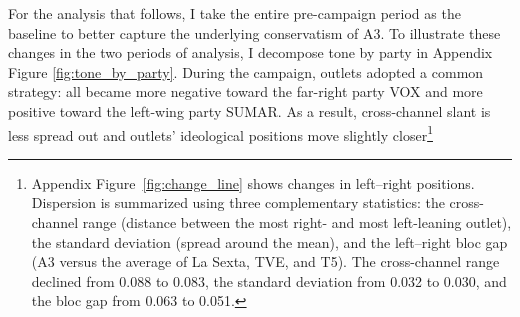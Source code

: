 \documentclass[12pt]{article}
\begin{document}
	For the analysis that follows, I take the entire pre-campaign period as the baseline to better capture the underlying conservatism of A3. To illustrate these changes in the two periods of analysis, I decompose tone by party in Appendix Figure \ref{fig:tone_by_party}. During the campaign, outlets adopted a common strategy: all became more negative toward the far-right party VOX and more positive toward the left-wing party SUMAR. As a result, cross-channel slant is less spread out and outlets’ ideological positions move slightly closer\footnote{Appendix Figure~\ref{fig:change_line} shows changes in left–right positions. Dispersion is summarized using three complementary statistics: the cross-channel range (distance between the most right- and most left-leaning outlet), the standard deviation (spread around the mean), and the left–right bloc gap (A3 versus the average of La Sexta, TVE, and T5). The cross-channel range declined from 0.088 to 0.083, the standard deviation from 0.032 to 0.030, and the bloc gap from 0.063 to 0.051.}
	
	
	
	
	
\end{document}
